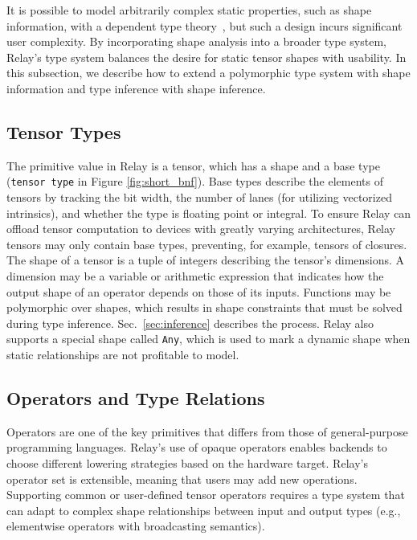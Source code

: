 It is possible to model arbitrarily complex static properties, such
  as shape information, with a dependent type theory~\citep{selsam_certigrad}, but such
  a design incurs significant user complexity.
By incorporating shape analysis into a broader type system,
  Relay's type system balances the desire for static tensor shapes
  with usability.
In this subsection, we describe how to extend a polymorphic type system with shape
  information and type inference with shape inference.

\subsection*{Tensor Types}

The primitive value in Relay is a tensor, which has
  a shape and a base type (\verb|tensor type| in Figure \ref{fig:short_bnf}).
Base types describe the elements of tensors by tracking
  the bit width,
  the number of lanes (for utilizing vectorized intrinsics),
  and whether the type is floating point or integral.
To ensure Relay can offload tensor computation to devices
  with greatly varying architectures,
  Relay tensors may only contain base types,
  preventing, for example, tensors of closures.
The shape of a tensor is a tuple of integers describing the tensor's dimensions.
A dimension may be a variable or arithmetic expression that indicates how the
  output shape of an operator depends on those of its inputs.
Functions may be polymorphic over shapes, which results
  in shape constraints that must be solved during type inference.
Sec.~\ref{sec:inference} describes the process.
Relay also supports a special shape called \verb|Any|, which is used
  to mark a dynamic shape when static relationships are not profitable
  to model.

\subsection*{Operators and Type Relations}
Operators are one of the key primitives that differs from those of
  general-purpose programming languages.
Relay's use of opaque operators enables backends to choose different
  lowering strategies based on the hardware target.
Relay's operator set is extensible, meaning that users may add new operations.
Supporting common or user-defined tensor operators requires a type system that can
  adapt to complex shape relationships between input and output types
  (e.g., elementwise operators with broadcasting semantics).

